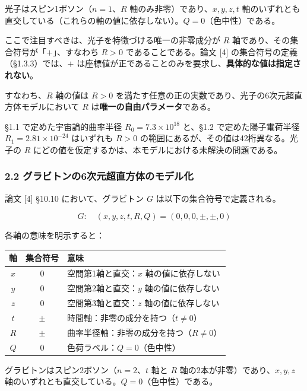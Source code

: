 \documentclass[
  a4paper,11pt]{ltjsarticle}
\newcounter{none}
\theoremstyle{definition}
\theoremstyle{remark}
\begin{document}
光子はスピン1ボソン（\(n = 1\)、\(R\) 軸のみ非零）であり、\(x, y, z, t\)
軸のいずれとも直交している（これらの軸の値に依存しない）。\(Q = 0\)（色中性）である。

ここで注目すべきは、光子を特徴づける唯一の非零成分が \(R\)
軸であり、その集合符号が「\(+\)」、すなわち \(R > 0\)
であることである。論文 {[}4{]} の集合符号の定義（§1.3.3）では、\(+\)
は座標値が正であることのみを要求し、\textbf{具体的な値は指定されない}。

すなわち、\(R\) 軸の値は \(R > 0\)
を満たす任意の正の実数であり、光子の6次元超直方体モデルにおいて \(R\)
は\textbf{唯一の自由パラメータ}である。

§1.1 で定めた宇宙論的曲率半径 \(R_0 = 7.3 \times 10^{18}\) と、§1.2
で定めた陽子電荷半径 \(R_1 = 2.81 \times 10^{-24}\) はいずれも \(R > 0\)
の範囲にあるが、その値は42桁異なる。光子の \(R\)
にどの値を仮定するかは、本モデルにおける未解決の問題である。

\subsubsection{2.2
グラビトンの6次元超直方体のモデル化}\label{ux30b0ux30e9ux30d3ux30c8ux30f3ux306e6ux6b21ux5143ux8d85ux76f4ux65b9ux4f53ux306eux30e2ux30c7ux30ebux5316}

論文 {[}4{]} §10.10 において、グラビトン \(G\)
は以下の集合符号で定義される。

\[G: \quad (x, y, z, t, R, Q) = (0, 0, 0, \pm, \pm, 0)\]

各軸の意味を明示すると：

{\def\LTcaptype{none} %
\begin{longtable}[]{@{}ccl@{}}
\toprule\noalign{}
軸 & 集合符号 & 意味 \\
\midrule\noalign{}
\endhead
\bottomrule\noalign{}
\endlastfoot
\(x\) & \(0\) & 空間第1軸と直交：\(x\) 軸の値に依存しない \\
\(y\) & \(0\) & 空間第2軸と直交：\(y\) 軸の値に依存しない \\
\(z\) & \(0\) & 空間第3軸と直交：\(z\) 軸の値に依存しない \\
\(t\) & \(\pm\) & 時間軸：非零の成分を持つ（\(t \neq 0\)） \\
\(R\) & \(\pm\) & 曲率半径軸：非零の成分を持つ（\(R \neq 0\)） \\
\(Q\) & \(0\) & 色荷ラベル：\(Q = 0\)（色中性） \\
\end{longtable}
}

グラビトンはスピン2ボソン（\(n = 2\)、\(t\) 軸と \(R\)
軸の2本が非零）であり、\(x, y, z\)
軸のいずれとも直交している。\(Q = 0\)（色中性）である。
\end{document}
